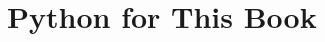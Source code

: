 \chapter{Python for This Book}\label{ch:T0}
\providecommand{\TzFiles}{}\renewcommand{\TzFiles}{345}
\providecommand{\TzLines}{}\renewcommand{\TzLines}{45734}
\providecommand{\TzCalls}{}\renewcommand{\TzCalls}{27297}
\providecommand{\TzNames}{}\renewcommand{\TzNames}{759}
\providecommand{\TzNfifty}{}\renewcommand{\TzNfifty}{25}
\providecommand{\TzNeighty}{}\renewcommand{\TzNeighty}{83}
\providecommand{\TzNninety}{}\renewcommand{\TzNninety}{159}
\providecommand{\TzNninetynine}{}\renewcommand{\TzNninetynine}{526}
\providecommand{\TzRareNames}{}\renewcommand{\TzRareNames}{362}
\providecommand{\TzRareShare}{}\renewcommand{\TzRareShare}{2.1}
\providecommand{\TzOwnCalls}{}\renewcommand{\TzOwnCalls}{5205}
\providecommand{\TzCommonCalls}{}\renewcommand{\TzCommonCalls}{1671}
\providecommand{\TzNumpyShare}{}\renewcommand{\TzNumpyShare}{34}
\providecommand{\TzPlotShare}{}\renewcommand{\TzPlotShare}{22}
\providecommand{\TzScipyShare}{}\renewcommand{\TzScipyShare}{3}
\providecommand{\TzPctFor}{}\renewcommand{\TzPctFor}{88}
\providecommand{\TzPctDef}{}\renewcommand{\TzPctDef}{72}
\providecommand{\TzPctIf}{}\renewcommand{\TzPctIf}{46}
\providecommand{\TzPctFstring}{}\renewcommand{\TzPctFstring}{84}
\providecommand{\TzPctKw}{}\renewcommand{\TzPctKw}{99}
\providecommand{\TzPctSlice}{}\renewcommand{\TzPctSlice}{79}
\providecommand{\TzPctComp}{}\renewcommand{\TzPctComp}{65}
\providecommand{\TzPctDict}{}\renewcommand{\TzPctDict}{93}
\providecommand{\TzPctUnpack}{}\renewcommand{\TzPctUnpack}{99}
\providecommand{\TzPctWhile}{}\renewcommand{\TzPctWhile}{6}
\providecommand{\TzPctLambda}{}\renewcommand{\TzPctLambda}{39}
\providecommand{\TzPctClass}{}\renewcommand{\TzPctClass}{2}
\providecommand{\TzPctDecorator}{}\renewcommand{\TzPctDecorator}{2}
\providecommand{\TzPctWith}{}\renewcommand{\TzPctWith}{9}
\providecommand{\TzPctTry}{}\renewcommand{\TzPctTry}{3}
\providecommand{\TzPctMatmul}{}\renewcommand{\TzPctMatmul}{28}
\providecommand{\TzPctYield}{}\renewcommand{\TzPctYield}{0}
\providecommand{\TzPctGlobal}{}\renewcommand{\TzPctGlobal}{0}
\providecommand{\TzPctNumpy}{}\renewcommand{\TzPctNumpy}{99}
\providecommand{\TzPctPlt}{}\renewcommand{\TzPctPlt}{88}
\providecommand{\TzPctScipy}{}\renewcommand{\TzPctScipy}{53}
\providecommand{\TzPctHealpy}{}\renewcommand{\TzPctHealpy}{10}
\providecommand{\TzPctCamb}{}\renewcommand{\TzPctCamb}{5}
\providecommand{\TzPctNumba}{}\renewcommand{\TzPctNumba}{1}
\providecommand{\TzPctMultiproc}{}\renewcommand{\TzPctMultiproc}{1}
